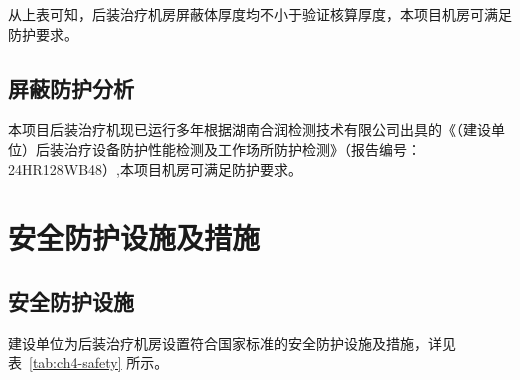 从上表可知，后装治疗机房屏蔽体厚度均不小于验证核算厚度，本项目机房可满足防护要求。

\subsection{屏蔽防护分析}

本项目后装治疗机现已运行多年根据湖南合润检测技术有限公司出具的《（建设单位）后装治疗设备防护性能检测及工作场所防护检测》（报告编号：24HR128WB48）,本项目机房可满足防护要求。

\section{安全防护设施及措施}

\subsection{安全防护设施}

建设单位为后装治疗机房设置符合国家标准的安全防护设施及措施，详见表~\ref{tab:ch4-safety} 所示。



